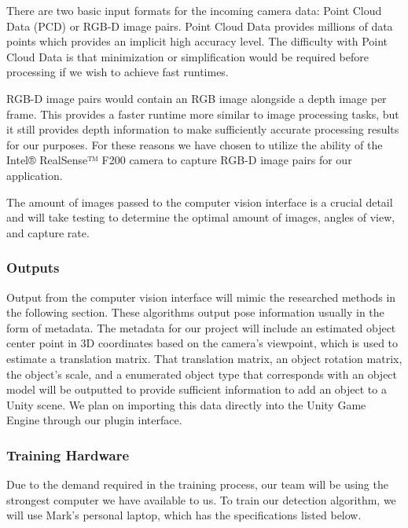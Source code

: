 \documentclass[12pt]{article}
\begin{document}
There are two basic input formats for the incoming camera data: Point
Cloud Data (PCD) or RGB-D image pairs. Point Cloud Data provides
millions of data points which provides an implicit high accuracy level.
The difficulty with Point Cloud Data is that minimization or
simplification would be required before processing if we wish to achieve
fast runtimes.

RGB-D image pairs would contain an RGB image alongside a depth image per
frame. This provides a faster runtime more similar to image processing
tasks, but it still provides depth information to make sufficiently
accurate processing results for our purposes. For these reasons we have
chosen to utilize the ability of the Intel® RealSense™ F200 camera to
capture RGB-D image pairs for our application.

The amount of images passed to the computer vision interface is a
crucial detail and will take testing to determine the optimal amount of
images, angles of view, and capture rate.

\subsubsection{Outputs}\label{outputs}

Output from the computer vision interface will mimic the researched
methods in the following section. These algorithms output pose
information usually in the form of metadata. The metadata for our
project will include an estimated object center point in 3D coordinates
based on the camera's viewpoint, which is used to estimate a translation
matrix. That translation matrix, an object rotation matrix, the object's
scale, and a enumerated object type that corresponds with an object
model will be outputted to provide sufficient information to add an
object to a Unity scene. We plan on importing this data directly into
the Unity Game Engine through our plugin interface.

\subsubsection{Training Hardware}\label{training-hardware}

Due to the demand required in the training process, our team will be
using the strongest computer we have available to us. To train our
detection algorithm, we will use Mark's personal laptop, which has the
specifications listed below.
\end{document}
